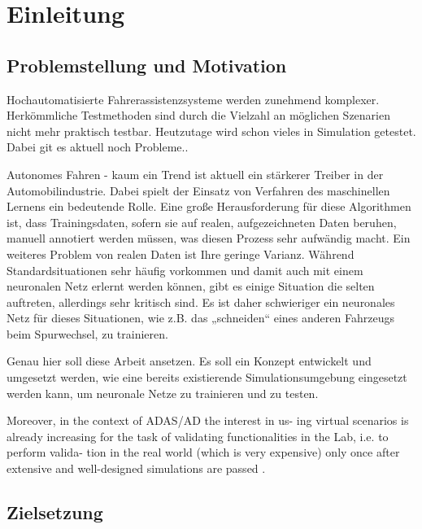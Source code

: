 
\chapter{Einleitung}
\label{einleitung}


\section{Problemstellung und Motivation}
\label{einleitung_problemstellung}

Hochautomatisierte Fahrerassistenzsysteme werden zunehmend komplexer. Herkömmliche Testmethoden sind durch die Vielzahl an möglichen Szenarien nicht mehr praktisch testbar. Heutzutage wird schon vieles in Simulation getestet. Dabei git es aktuell noch Probleme..

Autonomes Fahren - kaum ein Trend ist aktuell ein stärkerer Treiber in der Automobilindustrie. Dabei spielt der Einsatz von Verfahren des maschinellen Lernens ein bedeutende Rolle. Eine große Herausforderung für diese Algorithmen ist, dass Trainingsdaten, sofern sie auf realen, aufgezeichneten Daten beruhen, manuell annotiert werden müssen, was diesen Prozess sehr aufwändig macht. Ein weiteres Problem von realen Daten ist Ihre geringe Varianz. Während Standardsituationen sehr häufig vorkommen und damit auch mit einem neuronalen Netz erlernt werden können, gibt es einige Situation die selten auftreten, allerdings sehr kritisch sind. Es ist daher schwieriger ein neuronales Netz für dieses Situationen, wie z.B. das „schneiden“ eines anderen Fahrzeugs beim Spurwechsel, zu trainieren.

Genau hier soll diese Arbeit ansetzen. Es soll ein Konzept entwickelt und umgesetzt werden, wie eine bereits existierende Simulationsumgebung eingesetzt werden kann, um neuronale Netze zu trainieren und zu testen.

Moreover, in the context of ADAS/AD the interest in us- ing virtual scenarios is already increasing for the task of validating functionalities in the Lab, i.e. to perform valida- tion in the real world (which is very expensive) only once after extensive and well-designed simulations are passed \cite{ros2016synthia}.


\section{Zielsetzung}
\label{einleitung_zielsetzung}


